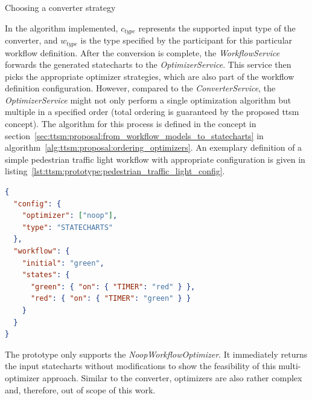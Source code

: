 \begin{algorithm}
\caption{Choosing a converter strategy}
\label{alg:ttsm:prototype:choosing_converter_strategy}
{
    {
    }
}
\end{algorithm}

In the algorithm implemented, $c_{type}$ represents the supported input type of the converter, and $w_{type}$ is the type specified by the participant for this particular workflow definition. After the conversion is complete, the \textit{WorkflowService} forwards the generated statecharts to the \textit{OptimizerService}. This service then picks the appropriate optimizer strategies, which are also part of the workflow definition configuration. However, compared to the \textit{ConverterService}, the \textit{OptimizerService} might not only perform a single optimization algorithm but multiple in a specified order (total ordering is guaranteed by the proposed \gls{ttsm} concept). The algorithm for this process is defined in the concept in section~\ref{sec:ttsm:proposal:from_workflow_models_to_statecharts} in algorithm~\ref{alg:ttsm:proposal:ordering_optimizers}. An exemplary definition of a simple pedestrian traffic light workflow with appropriate configuration is given in listing~\ref{lst:ttsm:prototype:pedestrian_traffic_light_config}.\\

\begin{lstlisting}[language=json,caption=Exemplary workflow definition of a pedestrian traffic light,captionpos=b,label=lst:ttsm:prototype:pedestrian_traffic_light_config]
{
  "config": {
    "optimizer": ["noop"],
    "type": "STATECHARTS"
  },
  "workflow": {
    "initial": "green",
    "states": {
      "green": { "on": { "TIMER": "red" } },
      "red": { "on": { "TIMER": "green" } }
    }
  }
}
\end{lstlisting}

The prototype only supports the \textit{NoopWorkflowOptimizer}. It immediately returns the input statecharts without modifications to show the feasibility of this multi-optimizer approach. Similar to the converter, optimizers are also rather complex and, therefore, out of scope of this work.

